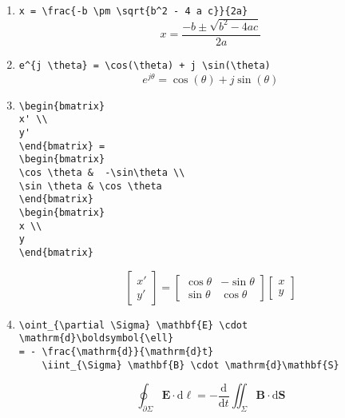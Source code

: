 \begin{enumerate}
\item \verb|x = \frac{-b \pm \sqrt{b^2 - 4 a c}}{2a}|
    \[x = \frac{-b \pm \sqrt{b^2 - 4 a c}}{2a} \]

\item \verb|e^{j \theta} = \cos(\theta) + j \sin(\theta)|
    \[e^{j \theta} = \cos(\theta) + j \sin(\theta)\]

\item
\begin{verbatim}
\begin{bmatrix}
x' \\
y'
\end{bmatrix} =
\begin{bmatrix}
\cos \theta &  -\sin\theta \\
\sin \theta & \cos \theta
\end{bmatrix}
\begin{bmatrix}
x \\
y
\end{bmatrix}
\end{verbatim}
\[
\begin{bmatrix}
x' \\
y'
\end{bmatrix} =
\begin{bmatrix}
\cos \theta &  -\sin\theta \\
\sin \theta & \cos \theta
\end{bmatrix}
\begin{bmatrix}
x \\
y
\end{bmatrix}
\]

\item
\begin{verbatim}
\oint_{\partial \Sigma} \mathbf{E} \cdot
\mathrm{d}\boldsymbol{\ell}
= - \frac{\mathrm{d}}{\mathrm{d}t}
    \iint_{\Sigma} \mathbf{B} \cdot \mathrm{d}\mathbf{S}
\end{verbatim}
    \[\oint_{\partial \Sigma} \mathbf{E} \cdot \mathrm{d}\boldsymbol{\ell}  = - \frac{\mathrm{d}}{\mathrm{d}t} \iint_{\Sigma} \mathbf{B} \cdot \mathrm{d}\mathbf{S}\]
\end{enumerate}
